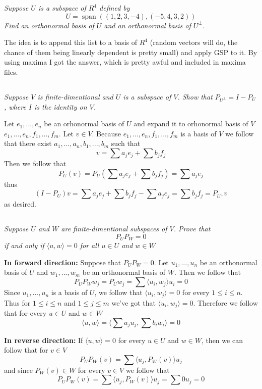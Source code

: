 \documentclass[11pt,oneside,titlepage]{book}
\DeclareMathOperator \Span {span}
\newcommand{\eangle}[1]{\langle #1 \rangle}
\begin{document}
\textit{Suppose $U$ is a subspace of $R^4$ defined by
  $$U = \Span((1, 2, 3, -4), (-5, 4, 3, 2))$$
  Find an orthonormal basis of $U$ and an orthonormal basis of $U^\perp$.}

The idea is to append this list to a basis of $R^4$ (random vectors will do, the chance of
them being linearly dependent is pretty small) and apply GSP to it. By using maxima I got
the answer, which is pretty awful and included in maxima files.


\subsection{}

\textit{Suppose $V$ is finite-dimentional and $U$ is a subspace of $V$. Show that
  $P_{U^\perp} = I - P_U$, where $I$ is the identity on $V$.}

Let $e_1, ..., e_n$ be an orhonormal basis of $U$ and expand it to orhonormal basis of $V$
$e_1, ..., e_n, f_1, ..., f_m$. Let $v \in V$. Because $e_1, ..., e_n, f_1, ..., f_m$ is
a basis of $V$ we follow that there exist $a_1, ..., a_n, b_1, ..., b_m$ such that
$$v = \sum{a_j e_j} + \sum{b_j f_j}$$
Then we follow that
$$P_U(v) = P_U(\sum{a_j e_j} + \sum{b_j f_j}) = \sum{a_j e_j}$$
thus
$$(I - P_U) v  = \sum{a_j e_j} + \sum{b_j f_j} - \sum{a_j e_j} = \sum{b_j f_j} =
P_{U^\perp}v$$
as desired.

\subsection{}

\textit{Suppose $U$ and $W$ are finite-dimentional subspaces of $V$. Prove that
  $$P_U P_W = 0$$
  if and only if $\eangle{u, w} = 0$ for all $u \in U$ and $w \in W$}

\textbf{In forward direction: }
Suppose that $P_U P_W = 0$.
Let $u_1, ..., u_n$ be an orthonormal basis of $U$ and $w_1, ..., w_m$ be an orthonormal basis of
$W$. Then we follow that 
$$P_U P_W w_j = P_U w_j = \sum{\eangle{u_i, w_j}u_i} = 0$$
Since $u_1, ..., u_n$ is a basis of $U$, we follow that $\eangle{u_i, w_j} = 0$ for every
$1 \leq i \leq n$. Thus for $1 \leq i \leq n$ and $1 \leq j \leq m$ we've got that
$\eangle{u_i, w_j} = 0$. Therefore we follow that for every $u \in U$ and $w \in W$
$$\eangle{u, w} = \eangle{\sum{a_j u_j}, \sum{b_i w_i}} = 0$$


\textbf{In reverse direction: }
If $\eangle{u, w} = 0$ for every $u \in U$ and $w \in W$, then we can follow that for $v \in V$
$$P_U P_W (v) = \sum{\eangle{u_j, P_W(v)} u_j}$$
and since $P_W(v) \in W$ for every $v \in V$ we follow that
$$P_U P_W (v) = \sum{\eangle{u_j, P_W(v)} u_j} = \sum{0 u_j} = 0$$
\end{document}
